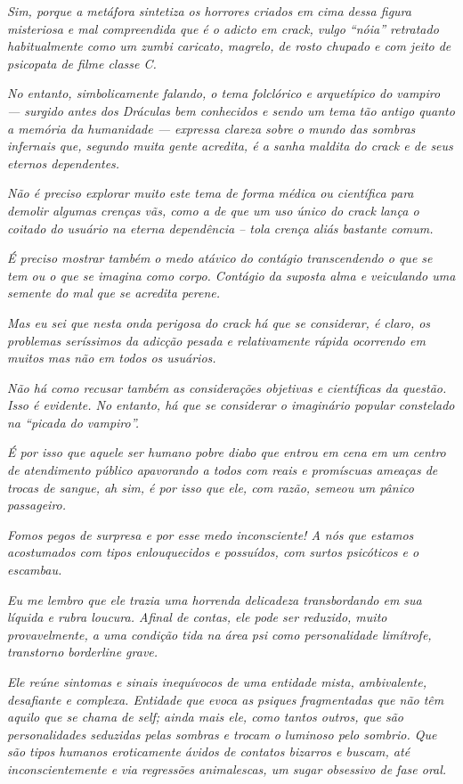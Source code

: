 \emph{Sim, porque a metáfora sintetiza os horrores criados em cima dessa
figura misteriosa e mal compreendida que é o adicto em crack, vulgo
``nóia'' retratado habitualmente como um zumbi caricato, magrelo, de
rosto chupado e com jeito de psicopata de filme classe C.}~

\emph{No entanto, simbolicamente falando, o tema folclórico e
arquetípico do vampiro --- surgido antes dos Dráculas bem conhecidos e
sendo um tema tão antigo quanto a memória da humanidade --- expressa
clareza sobre o mundo das sombras infernais que, segundo muita gente
acredita, é a sanha maldita do crack e de seus eternos dependentes.}~

\emph{Não é preciso explorar muito este tema de forma médica ou
científica para demolir algumas crenças vãs, como a de que um uso único
do crack lança o coitado do usuário na eterna dependência -- tola crença
aliás bastante comum.}~

\emph{É preciso mostrar também o medo atávico do contágio transcendendo
o que se tem ou o que se imagina como corpo. Contágio da suposta alma e
veiculando uma semente do mal que se acredita perene.}~

\emph{Mas eu sei que nesta onda perigosa do crack há que se considerar,
é claro, os problemas seríssimos da adicção pesada e relativamente
rápida ocorrendo em muitos mas não em todos os usuários.}~

\emph{Não há como recusar também as considerações objetivas e
científicas da questão. Isso é evidente. No entanto, há que se
considerar o imaginário popular constelado na ``picada do vampiro''.}~

\emph{É por isso que aquele ser humano pobre diabo que entrou em cena em
um centro de atendimento público apavorando a todos com reais e
promíscuas ameaças de trocas de sangue, ah sim, é por isso que ele, com
razão, semeou um pânico passageiro.}~

\emph{Fomos pegos de surpresa e por esse medo inconsciente! A nós que
estamos acostumados com tipos enlouquecidos e possuídos, com surtos
psicóticos e o escambau.}~

\emph{Eu me lembro que ele trazia uma horrenda delicadeza transbordando
em sua líquida e rubra loucura. Afinal de contas, ele pode ser reduzido,
muito provavelmente, a uma condição tida na área psi como personalidade
limítrofe, transtorno borderline grave.}~

\emph{Ele reúne sintomas e sinais inequívocos de uma entidade mista,
ambivalente, desafiante e complexa. Entidade que evoca as psiques
fragmentadas que não têm aquilo que se chama de self; ainda mais ele,
como tantos outros, que são personalidades seduzidas pelas sombras e
trocam o luminoso pelo sombrio. Que são tipos humanos eroticamente
ávidos de contatos bizarros e buscam, até inconscientemente e via
regressões animalescas, um sugar obsessivo de fase oral.}~

